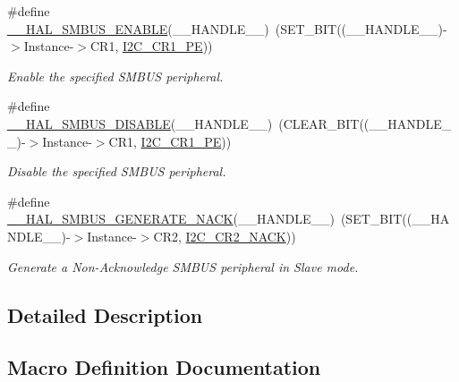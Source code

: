 \begin{DoxyCompactItemize}
\#define \hyperlink{group___s_m_b_u_s___exported___macros_gab33be047be5d261b7a54dc7b11dd49ae}{\+\_\+\+\_\+\+H\+A\+L\+\_\+\+S\+M\+B\+U\+S\+\_\+\+E\+N\+A\+B\+LE}(\+\_\+\+\_\+\+H\+A\+N\+D\+L\+E\+\_\+\+\_\+)~(S\+E\+T\+\_\+\+B\+IT((\+\_\+\+\_\+\+H\+A\+N\+D\+L\+E\+\_\+\+\_\+)-\/$>$Instance-\/$>$C\+R1, \hyperlink{group___peripheral___registers___bits___definition_ga953b0d38414808db79da116842ed3262}{I2\+C\+\_\+\+C\+R1\+\_\+\+PE}))
\begin{DoxyCompactList}\small\item\em Enable the specified S\+M\+B\+US peripheral. \end{DoxyCompactList}\item 
\#define \hyperlink{group___s_m_b_u_s___exported___macros_gaca1962f9b658f16afb11a888c9bddd8e}{\+\_\+\+\_\+\+H\+A\+L\+\_\+\+S\+M\+B\+U\+S\+\_\+\+D\+I\+S\+A\+B\+LE}(\+\_\+\+\_\+\+H\+A\+N\+D\+L\+E\+\_\+\+\_\+)~(C\+L\+E\+A\+R\+\_\+\+B\+IT((\+\_\+\+\_\+\+H\+A\+N\+D\+L\+E\+\_\+\+\_\+)-\/$>$Instance-\/$>$C\+R1, \hyperlink{group___peripheral___registers___bits___definition_ga953b0d38414808db79da116842ed3262}{I2\+C\+\_\+\+C\+R1\+\_\+\+PE}))
\begin{DoxyCompactList}\small\item\em Disable the specified S\+M\+B\+US peripheral. \end{DoxyCompactList}\item 
\#define \hyperlink{group___s_m_b_u_s___exported___macros_ga0897cee11905248ab6ad938fe376101f}{\+\_\+\+\_\+\+H\+A\+L\+\_\+\+S\+M\+B\+U\+S\+\_\+\+G\+E\+N\+E\+R\+A\+T\+E\+\_\+\+N\+A\+CK}(\+\_\+\+\_\+\+H\+A\+N\+D\+L\+E\+\_\+\+\_\+)~(S\+E\+T\+\_\+\+B\+IT((\+\_\+\+\_\+\+H\+A\+N\+D\+L\+E\+\_\+\+\_\+)-\/$>$Instance-\/$>$C\+R2, \hyperlink{group___peripheral___registers___bits___definition_ga8bcbbaf564cb68e3afed79c3cd34aa1f}{I2\+C\+\_\+\+C\+R2\+\_\+\+N\+A\+CK}))
\begin{DoxyCompactList}\small\item\em Generate a Non-\/\+Acknowledge S\+M\+B\+US peripheral in Slave mode. \end{DoxyCompactList}\end{DoxyCompactItemize}


\subsection{Detailed Description}


\subsection{Macro Definition Documentation}
\mbox{\label{group___s_m_b_u_s___exported___macros_gab4d14f4ae53d4e51b5fb90f3dedfe71e}} 
